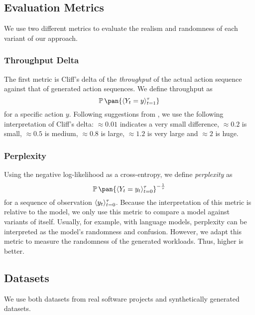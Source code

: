 \subsection{Evaluation Metrics}

We use two different metrics to evaluate the realism and randomness of each variant of our approach.

\subsubsection{Throughput Delta}

The first metric is Cliff's delta\cite{Cohen2013-up,Cliff1993-he} of the \emph{throughput} of the actual action sequence against that of generated action sequences. We define throughput as
\begin{equation}
    \prob\pan{\seq{Y_t = y}_{t=1}^\tau}
\end{equation}
for a specific action \(y\). Following suggestions from \cite{Sawilowsky2009-oy}, we use the following interpretation of Cliff's delta:
\(\approx 0.01\) indicates a very small difference, \(\approx 0.2\) is small, \(\approx 0.5\) is medium, \(\approx 0.8\) is large, \(\approx 1.2\) is very large and \(\approx 2\) is huge.

\subsubsection{Perplexity}

Using the negative log-likelihood as a cross-entropy, we define \emph{perplexity} as
\begin{equation}
    \prob\pan{\seq{Y_t = y_t}_{t=0}^{\tau}}^{-\frac{1}{\tau}}
\end{equation}
for a sequence of observation \(\langle y_t\rangle_{t=0}^\tau\). Because the interpretation of this metric is relative to the model, we only use this metric to compare a model against variants of itself. Usually, for example, with language models, perplexity can be interpreted as the model's randomness and confusion. However, we adapt this metric to measure the randomness of the generated workloads. Thus, higher is better.

\subsection{Datasets}\label{sec:dataset}

We use both datasets from real software projects and synthetically generated datasets.

